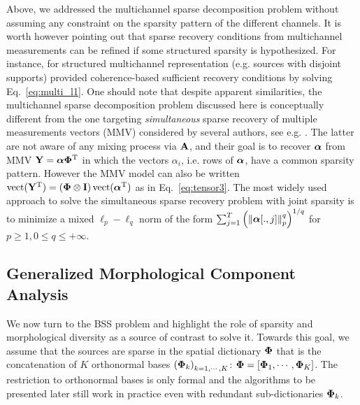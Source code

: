 Above, we addressed the multichannel sparse decomposition problem without assuming any constraint on the sparsity pattern 
of the different channels. It is worth however pointing out that sparse recovery conditions from multichannel measurements 
can be refined if some structured sparsity is hypothesized. For instance, for structured multichannel representation 
(e.g. sources with disjoint supports) \citep{GN05} provided coherence-based sufficient recovery conditions by solving Eq.~\eqref{eq:multi_l1}. 
One should note that despite apparent similarities, the multichannel sparse decomposition problem discussed here is conceptually 
different from the one targeting \textit{simultaneous} sparse recovery of multiple measurements vectors (MMV) considered by several authors, see e.g. 
\citep{CREK05,MalioutovMMV05,TroppMMV06,ChenHuo06,ArgyriouMMVLearning08,BachMMVLearning08,GribonvalMMV08,EldarMMV08,LouniciMMVLearning09,WainwrightMMV09}. 
The latter are not aware of any mixing process via ${\mathbf{A}}$, and their goal is to recover ${\boldsymbol \alpha}$ from MMV $\mathbf{Y}={\boldsymbol \alpha}{\bf\Phi}^{\mathrm{T}}$ in which 
the vectors $\alpha_i$, i.e. rows of ${\boldsymbol \alpha}$, have a common sparsity pattern. However the MMV model can also be written 
$\mathrm{vect}(\mathbf{Y}^{\mathrm{T}}) = \left({{\bf\Phi} \otimes \mathbf{I}}\right) \mathrm{vect}({\boldsymbol \alpha}^{\mathrm{T}})$ as in Eq.~\eqref{eq:tensor3}. The most widely used approach 
to solve the simultaneous sparse recovery problem with joint sparsity is to minimize a mixed $\ell_p-\ell_q$ norm of the form 
$\sum_{j=1}^T\left({\left\|{{\boldsymbol \alpha}[.,j]}\right\|_p^q}\right)^{1/q}$ for $p \geq 1, 0 \leq q \leq +\infty$.

\subsection{Generalized Morphological Component Analysis}
\label{subsec:gmca}
We now turn to the BSS problem and highlight the role of sparsity and morphological diversity as a source of contrast to solve it. 
Towards this goal, we assume that the sources are sparse in the spatial dictionary ${\bf\Phi}$ that is the concatenation of $K$ orthonormal bases 
$\left({{{\bf\Phi}}_{k}}\right)_{k=1,\cdots,K}$: ${\bf\Phi} = \left[{{\bf\Phi}}_{1},\cdots,{{\bf\Phi}}_{K} \right]$. The restriction to orthonormal bases is only formal 
and the algorithms to be presented later still work in practice even with redundant sub-dictionaries ${\bf\Phi}_k$. 

